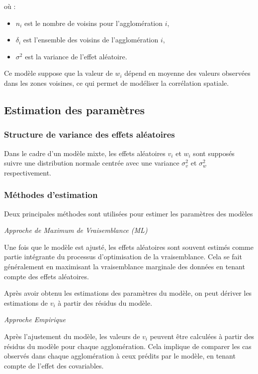 \documentclass[
]{article}
\providecommand{\tightlist}{%
  \setlength{\itemsep}{0pt}\setlength{\parskip}{0pt}}
\begin{document}
où :

\begin{itemize}
\tightlist
\item
  \(n_i\) est le nombre de voisins pour l'agglomération \(i\),
\item
  \(\delta_i\) est l'ensemble des voisins de l'agglomération \(i\),
\item
  \(\sigma^2\) est la variance de l'effet aléatoire.
\end{itemize}

Ce modèle suppose que la valeur de \(w_i\) dépend en moyenne des valeurs
observées dans les zones voisines, ce qui permet de modéliser la
corrélation spatiale.

\subsection{Estimation des
paramètres}\label{estimation-des-paramuxe8tres}

\subsubsection{Structure de variance des effets
aléatoires}\label{structure-de-variance-des-effets-aluxe9atoires}

Dans le cadre d'un modèle mixte, les effets aléatoires \(v_i\) et
\(w_i\) sont supposés suivre une distribution normale centrée avec une
variance \(\sigma_v^2\) et \(\sigma_w^2\) respectivement.

\subsubsection{Méthodes d'estimation}\label{muxe9thodes-destimation}

Deux principales méthodes sont utilisées pour estimer les paramètres des
modèles

\emph{Approche de Maximum de Vraisemblance (ML)}

Une fois que le modèle est ajusté, les effets aléatoires sont souvent
estimés comme partie intégrante du processus d'optimisation de la
vraisemblance. Cela se fait généralement en maximisant la vraisemblance
marginale des données en tenant compte des effets aléatoires.

Après avoir obtenu les estimations des paramètres du modèle, on peut
dériver les estimations de \(v_i\) à partir des résidus du modèle.

\emph{Approche Empirique}

Après l'ajustement du modèle, les valeurs de \(v_i\) peuvent être
calculées à partir des résidus du modèle pour chaque agglomération. Cela
implique de comparer les cas observés dans chaque agglomération à ceux
prédits par le modèle, en tenant compte de l'effet des covariables.
\end{document}
